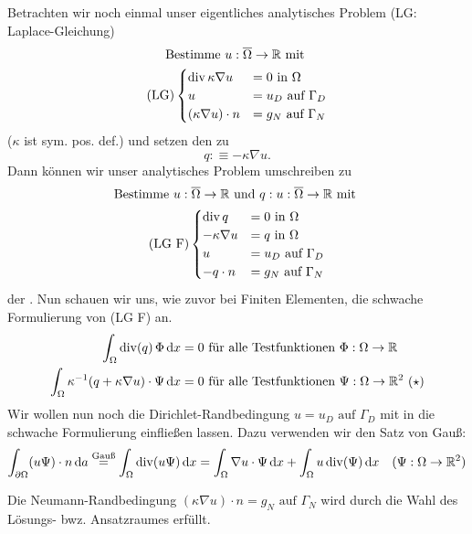 Betrachten wir noch einmal unser eigentliches analytisches Problem (LG: Laplace-Gleichung) 
\begin{gather*}
 \text{Bestimme } u:\overline{\Omega} \to \mathbb{R} \text{ mit }\\	
	\text{(LG)}\begin{cases}
	\operatorname{div} \kappa \nabla u &= 0 \text{ in } \Omega\\
	u &= u_D \text{ auf } \Gamma_D \\
	(\kappa\nabla u) \cdot n &= g_N \text{ auf } \Gamma_N \\
	\end{cases}
\end{gather*}
($ \kappa $ ist sym. pos. def.) und setzen den  zu 
\[ q :\equiv - \kappa \nabla u. \]
Dann können wir unser analytisches Problem umschreiben zu 
\begin{gather*}
	\text{Bestimme } u:\overline{\Omega} \to \mathbb{R} \text{ und } q: u:\overline{\Omega} \to \mathbb{R} \text{ mit } \\
		\text{(LG F)}\begin{cases}
		\operatorname{div} q &= 0 \text{ in } \Omega\\
		- \kappa \nabla u &= q \text{ in } \Omega\\
		u &= u_D \text{ auf } \Gamma_D \\
		-q \cdot n &= g_N \text{ auf } \Gamma_N \\
		\end{cases}
\end{gather*} 
der . Nun schauen wir uns, wie zuvor bei Finiten Elementen, die schwache Formulierung von (LG F) an.
\begin{align*}
	\int_\Omega \operatorname{div}(q)\, \Phi \mathop{}\!\mathrm{d} x = 0 &\text{ für alle Testfunktionen } \Phi: \Omega \to \mathbb{R} \\
	\int_{\Omega} \kappa^{-1} (q + \kappa \nabla u) \cdot \Psi \mathop{}\!\mathrm{d} x = 0 &\text{ für alle Testfunktionen } \Psi:\Omega \to \mathbb{R}^2 \ (\star)
\end{align*}
Wir wollen nun noch die Dirichlet-Randbedingung $ 	u = u_D \text{ auf } \Gamma_D $ mit in die schwache Formulierung einfließen lassen. Dazu verwenden wir den Satz von Gauß:
\[ \int_{\partial\Omega} (u\Psi) \cdot n \mathop{}\!\mathrm{d} a \stackrel{\text{Gauß}}{=} \int_{\Omega} \operatorname{div}(u\Psi) \mathop{}\!\mathrm{d} x = \int_{\Omega} \nabla u \cdot \Psi \mathop{}\!\mathrm{d} x + \int_{\Omega} u \operatorname{div}(\Psi) \mathop{}\!\mathrm{d} x \quad (\Psi:\Omega \to \mathbb{R}^2) \]

Die Neumann-Randbedingung $ (\kappa\nabla u) \cdot n = g_N \text{ auf } \Gamma_N $ wird durch die Wahl des Lösungs- bwz. Ansatzraumes erfüllt.
\bigskip

